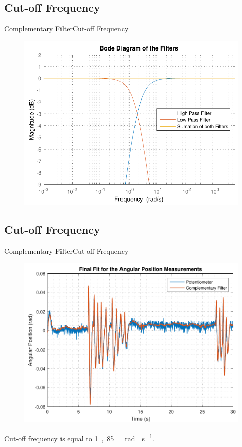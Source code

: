 \subsection{Cut-off Frequency}
\begin{frame}{Complementary Filter}{Cut-off Frequency}
\begin{figure}
	\centering
	\includegraphics[scale=0.6]{Pictures/bodeFilters.pdf}
\end{figure}
\end{frame}
\subsection{Cut-off Frequency}
\begin{frame}{Complementary Filter}{Cut-off Frequency}
	\begin{figure}
		\centering
		\includegraphics[scale=0.55]{Pictures/filterSensTool.pdf}
	\end{figure}
Cut-off frequency is equal to \si{1,85\ rad \cdot s^{-1}}.
\end{frame}
